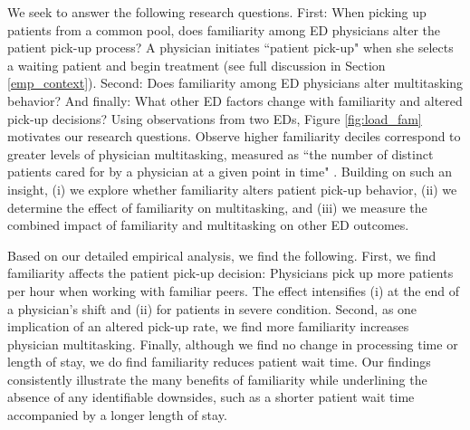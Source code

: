  We seek to answer the following research questions. First: When picking up patients from a common pool, does familiarity among ED physicians alter the patient pick-up process? A physician initiates “patient pick-up" when she selects a waiting patient and begin treatment (see full discussion in Section \ref{emp_context}). Second: Does familiarity among ED physicians alter multitasking behavior? And finally: What other ED factors change with familiarity and altered pick-up decisions? Using observations from two EDs, Figure \ref{fig:load_fam} motivates our research questions. Observe higher familiarity deciles correspond to greater levels of physician multitasking, measured as “the number of distinct patients cared for by a physician at a given point in time" \citep[p. 169]{KC2014}. Building on such an insight, (i) we explore whether familiarity alters patient pick-up behavior, (ii) we determine the effect of familiarity on multitasking, and (iii) we measure the combined impact of familiarity and multitasking on other ED outcomes.
 
 Based on our detailed empirical analysis, we find the following. First, we find familiarity affects the patient pick-up decision: Physicians pick up more patients per hour when working with familiar peers. The effect intensifies (i) at the end of a physician's shift and (ii) for patients in severe condition. Second, as one implication of an altered pick-up rate, we find more familiarity increases physician multitasking. Finally, although we find no change in processing time or length of stay, we do find familiarity reduces patient wait time. Our findings consistently illustrate the many benefits of familiarity while underlining the absence of any identifiable downsides, such as a shorter patient wait time accompanied by a longer length of stay.
 
